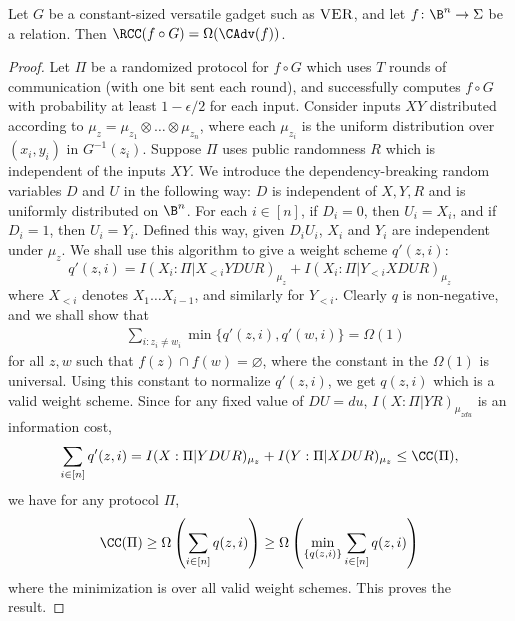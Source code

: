 \begin{theorem}
Let $G$ be a constant-sized versatile gadget such as
$\textsc{VER}$, and let $f\colon\B^n\to\Sigma$ be a relation.
Then $\RCC(f\circ G) =\Omega(\CAdv(f))$.
\end{theorem}

\begin{proof}
Let $\Pi$ be a randomized protocol for $f\circ G$ which uses $T$ rounds
of communication (with one bit sent each round), and successfully computes $f\circ G$ with probability at least $1-\epsilon/2$ for each input. Consider inputs $XY$ distributed according to $\mu_z = \mu_{z_1}\otimes\ldots\otimes\mu_{z_n}$, where each $\mu_{z_i}$ is the uniform distribution over $(x_i,y_i)$ in $G^{-1}(z_i)$. Suppose $\Pi$ uses public randomness $R$ which is independent of the inputs $XY$. We introduce the dependency-breaking random variables $D$ and $U$ \cite{BJKS04} in the following way: $D$ is independent of $X, Y, R$ and is uniformly distributed on $\B^n$. For each $i \in [n]$, if $D_i=0$, then $U_i = X_i$, and if $D_i=1$, then $U_i=Y_i$. Defined this way, given $D_iU_i$, $X_i$ and $Y_i$ are independent under $\mu_z$. We shall use this algorithm to give a weight scheme $q'(z,i)$:
\[q'(z,i)=I(X_i:\Pi|X_{<i} YDUR)_{\mu_z} + I(X_i:\Pi|Y_{<i}XDUR)_{\mu_z}\]
where $X_{<i}$ denotes $X_1\ldots X_{i-1}$, and similarly for $Y_{<i}$. Clearly $q$ is non-negative, and we shall show that
\begin{align*}
& \sum_{i:z_i\neq w_i}\min\{q'(z,i),q'(w,i)\} = \Omega(1)
\end{align*}
for all $z,w$ such that $f(z) \cap f(w) = \varnothing$, where the constant in the $\Omega(1)$ is universal. Using this constant to normalize $q'(z,i)$, we get $q(z,i)$ which is a valid weight scheme. Since for any fixed value of $DU=du$, $I(X:\Pi|YR)_{\mu_{zdu}}$ is an information cost,
\[ \sum_{i \in [n]}q'(z,i) = I(X:\Pi|YDUR)_{\mu_z} + I(Y:\Pi|XDUR)_{\mu_z} \leq \CC(\Pi),\]
we have for any protocol $\Pi$,
\[ \CC(\Pi) \geq \Omega\left(\sum_{i \in [n]}q(z,i)\right) \geq \Omega\left(\min_{\{q(z,i)\}}\sum_{i \in [n]}q(z,i)\right) \]
where the minimization is over all valid weight schemes. This proves the result.


\end{proof}
